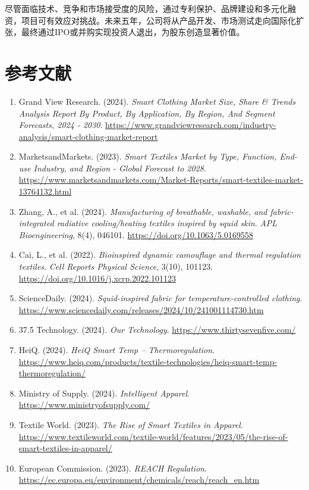 \documentclass[UTF8]{report}
\theoremstyle{MyLineTheoremStyle} %
\theoremstyle{MyBlockTheoremStyle} %
\theoremstyle{MySubsubsectionStyle} %
\begin{document}
尽管面临技术、竞争和市场接受度的风险，通过专利保护、品牌建设和多元化融资，项目可有效应对挑战。未来五年，公司将从产品开发、市场测试走向国际化扩张，最终通过IPO或并购实现投资人退出，为股东创造显著价值。

\chapter{参考文献}
\sloppy
\begin{enumerate}
    \item Grand View Research. (2024). \textit{Smart Clothing Market Size, Share \& Trends Analysis Report By Product, By Application, By Region, And Segment Forecasts, 2024 - 2030}. \url{https://www.grandviewresearch.com/industry-analysis/smart-clothing-market-report}
    \item MarketsandMarkets. (2023). \textit{Smart Textiles Market by Type, Function, End-use Industry, and Region - Global Forecast to 2028}. \url{https://www.marketsandmarkets.com/Market-Reports/smart-textiles-market-13764132.html}
    \item Zhang, A., et al. (2024). \textit{Manufacturing of breathable, washable, and fabric-integrated radiative cooling/heating textiles inspired by squid skin}. \textit{APL Bioengineering}, 8(4), 046101. \url{https://doi.org/10.1063/5.0169558}
    \item Cai, L., et al. (2022). \textit{Bioinspired dynamic camouflage and thermal regulation textiles}. \textit{Cell Reports Physical Science}, 3(10), 101123. \url{https://doi.org/10.1016/j.xcrp.2022.101123}
    \item ScienceDaily. (2024). \textit{Squid-inspired fabric for temperature-controlled clothing}. \url{https://www.sciencedaily.com/releases/2024/10/241001114730.htm}
    \item 37.5 Technology. (2024). \textit{Our Technology}. \url{https://www.thirtysevenfive.com/}
    \item HeiQ. (2024). \textit{HeiQ Smart Temp – Thermoregulation}. \url{https://www.heiq.com/products/textile-technologies/heiq-smart-temp-thermoregulation/}
    \item Ministry of Supply. (2024). \textit{Intelligent Apparel}. \url{https://www.ministryofsupply.com/}
    \item Textile World. (2023). \textit{The Rise of Smart Textiles in Apparel}. \url{https://www.textileworld.com/textile-world/features/2023/05/the-rise-of-smart-textiles-in-apparel/}
    \item European Commission. (2023). \textit{REACH Regulation}. \url{https://ec.europa.eu/environment/chemicals/reach/reach_en.htm}

\end{enumerate}
\end{document}
